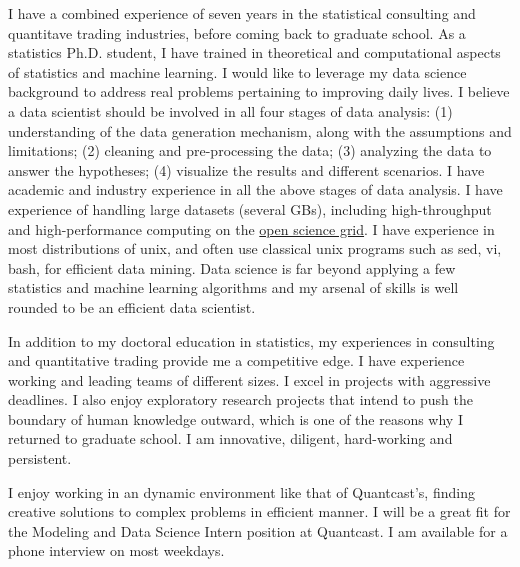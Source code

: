 \documentclass{letter} %
\begin{document}
\begin{letter}
\noindent %
I have a combined experience of seven years in the statistical consulting and quantitave trading industries, before coming back to graduate school. As a statistics Ph.D. student, I have trained in theoretical and computational aspects of statistics and machine learning. I would like to leverage my data science background to address real problems pertaining to improving daily lives. I believe a data scientist should be involved in all four stages of data analysis: (1) understanding of the data generation mechanism, along with the assumptions and limitations; (2) cleaning and pre-processing the data; (3) analyzing the data to answer the hypotheses; (4) visualize the results and different scenarios. I have academic and industry experience in all the above stages of data analysis. I have experience of handling large datasets (several GBs), including high-throughput and high-performance computing on the \href{http://www.opensciencegrid.org/}{open science grid}. I have experience in most distributions of unix, and often use classical unix programs such as sed, vi, bash, for efficient data mining. Data science is far beyond applying a few statistics and machine learning algorithms and my arsenal of skills is well rounded to be an efficient data scientist. 

In addition to my doctoral education in statistics, my experiences in consulting and quantitative trading provide me a competitive edge. I have experience working and leading teams of different sizes. I excel in projects with aggressive deadlines. I also enjoy exploratory research projects that intend to push the boundary of human knowledge outward, which is one of the reasons why I returned to graduate school. I am innovative, diligent, hard-working and persistent. 

\noindent %
I enjoy working in an dynamic environment like that of Quantcast's, finding creative solutions to complex problems in efficient manner. I will be a great fit for the Modeling and Data Science Intern position at Quantcast. I am available for a phone interview on most weekdays. 


\end{letter}
\end{document}
